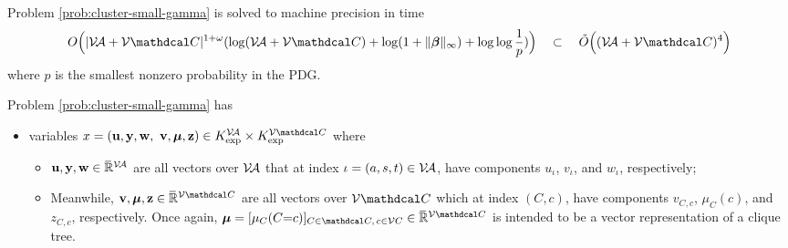 \documentclass{article}
\begin{document}
\begin{lemma}\label{lem:smallgamma-polytime}
    Problem \eqref{prob:cluster-small-gamma} is solved to machine precision in time
    \[
        O\Big( |\V\!\Ar + \V\mathdcal C|^{1 + \omega} ( \log (\V\!\Ar + \V\mathdcal C) + \log(1+ \Vert\bbeta\Vert_\infty) + \log \log \frac{1}{p}) \Big)
        \quad
        \subset 
        \quad
        \tilde O\Big( (\V\!\Ar + \V\mathdcal C)^4 \Big)
    \]
    where $p$ is the smallest nonzero probability in the PDG.
\end{lemma}
\begin{lproof}
    Problem \eqref{prob:cluster-small-gamma} has 
    \begin{itemize}[label=$\blacktriangleright$]
    \item variables 
        $x = (\mat u, \mat y, \mat w,\,\, \mat v, \bmu, \mat z)
        \in K_{\exp}^{\V\!\Ar} \times K_{\exp}^{\V \mathdcal C}$
        where 
        \begin{itemize}[label=\textbullet]
        \item 
        $\mathbf{u,y,w} \in \mskip1mu\overline{\mskip-1mu\mathbb R\!}\,^{\mathcal V\!\mathcal A}$
            are all vectors over $\mathcal V\!\mathcal A$
            that at index $\iota = (a,s,t) \in \mathcal V\!\mathcal A$, have 
            components $u_\iota$, $v_\iota$, and $w_\iota$, respectively;
        \item 
        Meanwhile, 
        $\mathbf{v,\bmu,z} \in \Rext^{\V\mathdcal C}$
            are all vectors over $\V\mathdcal C$ 
            which at index $(C,c)$, have 
            components $v_{C,c}$, $\mu_C(c)$, and $z_{C,c}$, respectively.
            Once again, $\bmu = [\mu_{C}(C{=}c)]_%
            {C \in \mathdcal C,\,c \in\V C}
             \in \Rext^{\V \mathdcal C}$ is intended to be a vector representation of a clique tree.
    \end{itemize}


\end{itemize}
\end{lproof}
\end{document}
